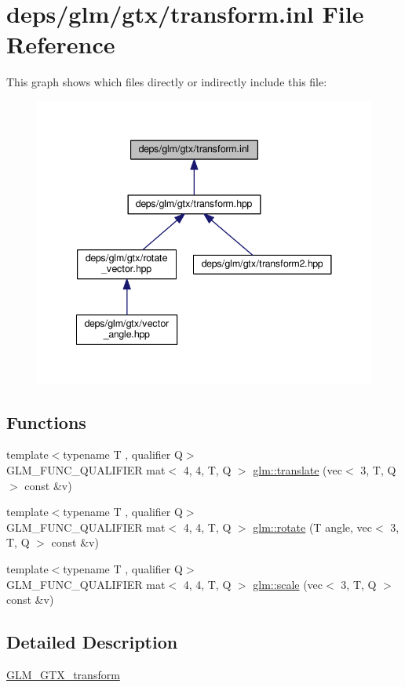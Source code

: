 \hypertarget{transform_8inl}{}\section{deps/glm/gtx/transform.inl File Reference}
\label{transform_8inl}
This graph shows which files directly or indirectly include this file\+:
\nopagebreak
\begin{figure}[H]
\begin{center}
\leavevmode
\includegraphics[width=341pt]{d9/d71/transform_8inl__dep__incl}
\end{center}
\end{figure}
\subsection*{Functions}
\begin{DoxyCompactItemize}
\item 
{\footnotesize template$<$typename T , qualifier Q$>$ }\\G\+L\+M\+\_\+\+F\+U\+N\+C\+\_\+\+Q\+U\+A\+L\+I\+F\+I\+ER mat$<$ 4, 4, T, Q $>$ \hyperlink{group__gtx__transform_ga309a30e652e58c396e2c3d4db3ee7658}{glm\+::translate} (vec$<$ 3, T, Q $>$ const \&v)
\item 
{\footnotesize template$<$typename T , qualifier Q$>$ }\\G\+L\+M\+\_\+\+F\+U\+N\+C\+\_\+\+Q\+U\+A\+L\+I\+F\+I\+ER mat$<$ 4, 4, T, Q $>$ \hyperlink{group__gtx__transform_gaf599be4c0e9d99be1f9cddba79b6018b}{glm\+::rotate} (T angle, vec$<$ 3, T, Q $>$ const \&v)
\item 
{\footnotesize template$<$typename T , qualifier Q$>$ }\\G\+L\+M\+\_\+\+F\+U\+N\+C\+\_\+\+Q\+U\+A\+L\+I\+F\+I\+ER mat$<$ 4, 4, T, Q $>$ \hyperlink{group__gtx__transform_gafbeefee8fec884d566e4ada0049174d7}{glm\+::scale} (vec$<$ 3, T, Q $>$ const \&v)
\end{DoxyCompactItemize}


\subsection{Detailed Description}
\hyperlink{group__gtx__transform}{G\+L\+M\+\_\+\+G\+T\+X\+\_\+transform} 